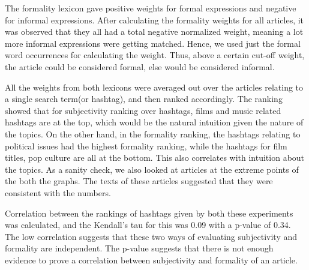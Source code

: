 The formality lexicon gave positive weights for formal expressions and negative for informal expressions. After calculating the formality weights for all articles, it was observed that they all had a total negative normalized weight, meaning a lot more informal expressions were getting matched. Hence, we used just the formal word occurrences for calculating the weight. Thus, above a certain cut-off weight, the article could be considered formal, else would be considered informal.

All the weights from both lexicons were averaged out over the articles relating to a single search term(or hashtag), and then ranked accordingly. The ranking showed that for subjectivity ranking over hashtags, films and music related hashtags are at the top, which would be the natural intuition given the nature of the topics. On the other hand, in the formality ranking, the hashtags relating to political issues had the highest formality ranking, while the hashtags for film titles, pop culture are all at the bottom. This also correlates with intuition about the topics. As a sanity check, we also looked at articles at the extreme points of the both the graphs. The texts of these articles suggested that they were consistent with the numbers.

Correlation between the rankings of hashtags given by both these experiments was calculated, and the Kendall’s tau for this was 0.09 with a p-value of 0.34. The low correlation suggests that these two ways of evaluating subjectivity and formality are independent. The p-value suggests that there is not enough evidence to prove a correlation between subjectivity and formality of an article.